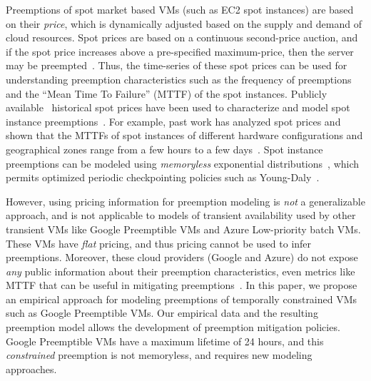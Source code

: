 Preemptions of spot market based VMs (such as EC2 spot instances) are based on their \emph{price}, which is dynamically adjusted based on the supply and demand of cloud resources. 
Spot prices are based on a continuous second-price auction, and if the spot price increases above a pre-specified maximum-price, then the server may be preempted~\cite{spot-pricing2}. 
%
Thus, the time-series of these spot prices can be used for understanding preemption characteristics such as the frequency of preemptions and the ``Mean Time To Failure'' (MTTF) of the spot instances. 
Publicly available~\cite{bidding4} historical spot prices have been used to characterize and model spot instance preemptions~\cite{spotcheck, bid-cloud, transient-guarantees, wolski2016providing}. %
For example, past work has analyzed spot prices and shown that the MTTFs of spot instances of different hardware configurations and geographical zones range from a few hours to a few days~\cite{wolski_probabilistic_2017, icdcs-spotlight, wolski2016providing, baughman2018predicting, wolski2017probabilistic}.
%
Spot instance preemptions can be modeled using \emph{memoryless}  exponential distributions~\cite{bid-cloud, hotcloud-not-bid, flint, ghit-spark-hpdc, chien-ic2e19}, which permits optimized periodic checkpointing policies such as Young-Daly~\cite{daly2006higher}. 



However, using pricing information for preemption modeling is \emph{not} a generalizable approach, and is not applicable to models of transient availability used by other transient VMs like Google Preemptible VMs and Azure Low-priority batch VMs. 
%
These VMs have \emph{flat} pricing, and thus pricing cannot be used to infer preemptions. 
%
Moreover, these cloud providers (Google and Azure) do not expose \emph{any} public information about their preemption characteristics, even metrics like MTTF that can be useful in mitigating preemptions~\cite{chien-ic2e19}. 
%
%
In this paper, we propose an empirical approach for modeling preemptions of temporally constrained VMs such as Google Preemptible VMs.
%
Our empirical data and the resulting preemption model allows the development of preemption mitigation policies. 
%
Google Preemptible VMs have a maximum lifetime of 24 hours, and this \emph{constrained} preemption is not memoryless, and requires new modeling approaches. 




